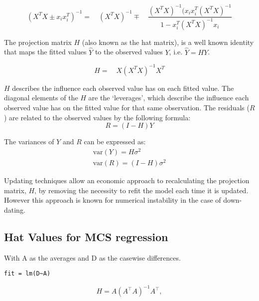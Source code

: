 \documentclass[12pt, a4paper]{article}
\begin{document}
\begin{equation}
(X^{T}X \pm x_{i}x_{i}^{T})^{-1} = \quad(X^{T}X )^{-1} \mp \quad
\frac{(X^{T}X)^{-1}(x_{i}x_{i}^{T}(X^{T}X)^{-1}}{1-x_{i}^{T}(X^{T}X)^{-1}x_{i}}
\end{equation}


The projection matrix $H$ (also known as the hat matrix), is a
well known identity that maps the fitted values $\hat{Y}$ to the
observed values $Y$, i.e. $\hat{Y} = HY$.


\begin{equation}
H =\quad X(X^{T}X)^{-1}X^{T}
\end{equation}


$H$ describes the influence each observed value has on each fitted value. The diagonal elements of the $H$ are the `leverages', which describe the influence each observed value has on the fitted value for that same observation. The residuals ($R$) are related to the observed values by the following formula:
\begin{equation}
R = (I-H)Y
\end{equation}


The variances of $Y$ and $R$ can be expressed as:
\begin{eqnarray}
\mbox{var}(Y) = H\sigma^{2} \nonumber\\
\mbox{var}(R) = (I-H)\sigma^{2}
\end{eqnarray}


Updating techniques allow an economic approach to recalculating the projection matrix, $H$, by removing the necessity to refit the model each time it is updated. However this approach is known for
numerical instability in the case of down-dating.






\subsection{Hat Values for MCS regression}


With A as the averages and D as the casewise differences.
\begin{verbatim}
fit = lm(D~A)
\end{verbatim}


\begin{displaymath}
H = A \left(A^\top  A\right)^{-1} A^\top ,
\end{displaymath}



\end{document}
